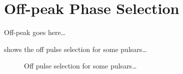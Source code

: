 \section{Off-peak Phase Selection}

Off-peak goes here\ldots

 shows the off pulse selection for some pulsars\dots

\begin{figure}
  \ifdefined\bwfigures
  \else
  \fi
  \caption{Off pulse selection for some pulsars\dots}
  \label{fig:off_pulse_select}
\end{figure}
